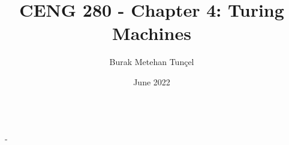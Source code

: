 \documentclass{article}
\title{CENG 280 - Chapter 4: Turing Machines}
\author{Burak Metehan Tunçel}
\date{June 2022}
\makeatletter
\newcounter{definition}[section]
\renewcommand\maketitle{
{\raggedright %
\begin{center}
{\Large \bfseries \@title}\\[2ex] 
{\large \@author \ - \@date}\\[2ex]
\end{center}}} %
\makeatother
\begin{document}
\maketitle

\begin{multicols}{2}
\setlength{\columnsep}{1.5cm}
\setlength{\columnseprule}{0.2pt}











\end{multicols}
\end{document}
